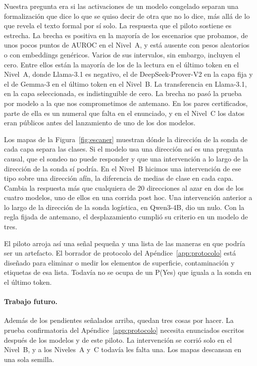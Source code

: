 \documentclass[10pt]{article}
\begin{document}
Nuestra pregunta era si las activaciones de un modelo congelado separan una formalización que dice lo que se quiso
decir de otra que no lo dice, más allá de lo que revela el texto formal por sí solo. La respuesta que el piloto
sostiene es estrecha. La brecha es positiva en la mayoría de los escenarios que probamos, de unos pocos puntos de
AUROC en el Nivel~A, y está ausente con pesos aleatorios o con embeddings genéricos. Varios de sus intervalos, sin
embargo, incluyen el cero. Entre ellos están la mayoría de los de la lectura en el último token en el Nivel~A, donde Llama-3.1 es negativo, el de
DeepSeek-Prover-V2 en la capa fija y el de Gemma-3 en el último token en el Nivel~B. La transferencia en Llama-3.1, en la capa
seleccionada, es indistinguible de cero. La brecha no pasó la prueba por modelo a la que nos comprometimos de
antemano. En los pares certificados, parte de ella es un numeral que falta en el enunciado, y en el Nivel~C los
datos eran públicos antes del lanzamiento de uno de los dos modelos.

Los mapas de la Figura~\ref{fig:escaner} muestran dónde la dirección de la sonda de cada capa separa las clases. Si el modelo usa una dirección así es una pregunta causal, que el sondeo no puede responder y que una intervención a lo largo de la dirección de la
sonda sí podría.
En el Nivel~B hicimos una intervención de ese tipo sobre una dirección afín, la diferencia de medias de clase en cada
capa. Cambia la respuesta más que cualquiera de 20 direcciones al azar en dos de los cuatro modelos, uno de ellos en una corrida
post hoc.
Una intervención anterior a lo largo de la dirección de la sonda logística, en Qwen3-4B, dio un nulo.
Con la regla fijada de antemano, el desplazamiento cumplió su criterio en un modelo de tres.

El piloto arroja así una señal pequeña y una lista de las maneras en que podría ser un artefacto. El borrador de
protocolo del Apéndice~\ref{app:protocolo} está diseñado para eliminar o medir los elementos de superficie,
contaminación y etiquetas de esa lista. Todavía no se ocupa de un P(Yes) que iguala a la sonda en el último token.

\paragraph{Trabajo futuro.}
Además de los pendientes señalados arriba, quedan tres cosas por hacer. La prueba confirmatoria del Apéndice~\ref{app:protocolo} necesita enunciados escritos
después de los modelos y de este piloto. La intervención se corrió solo en el Nivel~B, y a los Niveles~A y~C todavía
les falta una. Los mapas descansan en una sola semilla.
\end{document}
